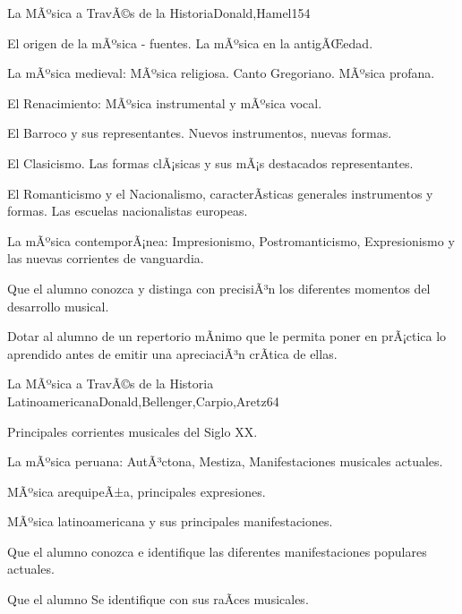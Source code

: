 \begin{syllabus}
\begin{unit}{La MÃºsica a TravÃ©s de la Historia}{Donald,Hamel}{15}{4}
\begin{topics}
	\item El origen de la mÃºsica - fuentes. La mÃºsica en la antigÃŒedad.
	\item La mÃºsica medieval: MÃºsica religiosa.  Canto Gregoriano. MÃºsica profana.
	\item El Renacimiento: MÃºsica instrumental y mÃºsica vocal.
	\item El Barroco y sus representantes. Nuevos instrumentos, nuevas formas.
	\item El Clasicismo. Las formas clÃ¡sicas y sus mÃ¡s destacados representantes.
	\item El Romanticismo y el Nacionalismo, caracterÃ­sticas generales instrumentos y formas. Las escuelas nacionalistas europeas.
	\item La mÃºsica contemporÃ¡nea: Impresionismo, Postromanticismo, Expresionismo y las nuevas corrientes de vanguardia.
\end{topics}
\begin{unitgoals}
	\item Que el alumno conozca y distinga con precisiÃ³n los diferentes momentos del desarrollo musical.
	\item Dotar al alumno de un repertorio mÃ­nimo que le permita poner en prÃ¡ctica lo aprendido antes de emitir una apreciaciÃ³n crÃ­tica de ellas.
\end{unitgoals}
\end{unit}

\begin{unit}{La MÃºsica a TravÃ©s de la Historia Latinoamericana}{Donald,Bellenger,Carpio,Aretz}{6}{4}
\begin{topics}
	\item Principales corrientes musicales del Siglo XX.
	\item La mÃºsica peruana: AutÃ³ctona, Mestiza, Manifestaciones musicales actuales.
	\item MÃºsica arequipeÃ±a, principales expresiones.
	\item MÃºsica latinoamericana y sus principales manifestaciones.
\end{topics}
\begin{unitgoals}
	\item Que el alumno conozca e identifique las diferentes manifestaciones populares actuales. 
	\item Que el alumno Se identifique con sus raÃ­ces musicales.
\end{unitgoals}
\end{unit}



\begin{coursebibliography}
\end{coursebibliography}

\end{syllabus}
